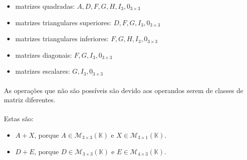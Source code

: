 
\begin{itemize}
	\item matrizes quadradas: $A, D, F, G, H, I_3, 0_{3\times3}$
	\item matrizes triangulares superiores: $D, F, G, I_3, 0_{3\times3}$
	\item matrizes triangulares inferiores: $F, G, H, I_3, 0_{3\times3}$
	\item matrizes diagonais: $F, G, I_3, 0_{3\times3}$
	\item matrizes escalares: $G, I_3, 0_{3\times3}$
\end{itemize}

\clearpage


\paragraph{} As operações que não são possíveis são devido aos operandos serem
de classes de matriz diferentes.

\paragraph{}Estas são:

\begin{itemize}
	\item $A + X$, porque $A \in \mathcal{M}_{3 \times 3}(\mathbb{K})$ e
		$X \in \mathcal{M}_{3 \times 1}(\mathbb{K})$.
	\item $D + E$, porque $D \in \mathcal{M}_{3 \times 3}(\mathbb{K})$ e
		$E \in \mathcal{M}_{4 \times 3}(\mathbb{K})$.
\end{itemize}

